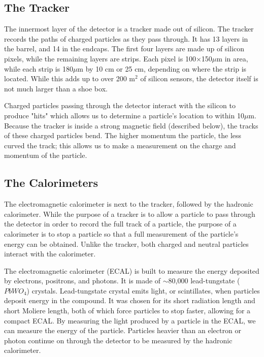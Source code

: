 \subsection{The Tracker}

The innermost layer of the detector is a tracker made out of silicon. The tracker records the paths of charged particles as they pass through. It has 13 layers in the barrel, and 14 in the endcaps. The first four layers are made up of silicon pixels, while the remaining layers are strips. Each pixel is 100$\times$150$\mu$m in area, while each strip is 180$\mu$m by 10 cm or 25 cm, depending on where the strip is located. While this adds up to over 200 $\text{m}^{2}$ of silicon sensors, the detector itself is not much larger than a shoe box. 

Charged particles passing through the detector interact with the silicon to produce "hits" which allows us to determine a particle's location to within 10$\mu$m. Because the tracker is inside a strong magnetic field (described below), the tracks of these charged particles bend. The higher momentum the particle, the less curved the track; this allows us to make a measurement on the charge and momentum of the particle.
\vspace{5mm}

\subsection{The Calorimeters}

The electromagnetic calorimeter is next to the tracker, followed by the hadronic calorimeter. While the purpose of a tracker is to allow a particle to pass through the detector in order to record the full track of a particle, the purpose of a calorimeter is to stop a particle so that a full measurement of the particle's energy can be obtained. Unlike the tracker, both charged and neutral particles interact with the calorimeter.

The electromagnetic calorimeter (ECAL) is built to measure the energy deposited by electrons, positrons, and photons. It is made of $\sim$80,000 lead-tungstate ($PbWO_4$) crystals. Lead-tungstate crystal emits light, or scintillates, when particles deposit energy in the compound. It was chosen for its short radiation length and short Moliere length, both of which force particles to stop faster, allowing for a compact ECAL. By measuring the light produced by a particle in the ECAL, we can measure the energy of the particle. Particles heavier than an electron or photon continue on through the detector to be measured by the hadronic calorimeter.


